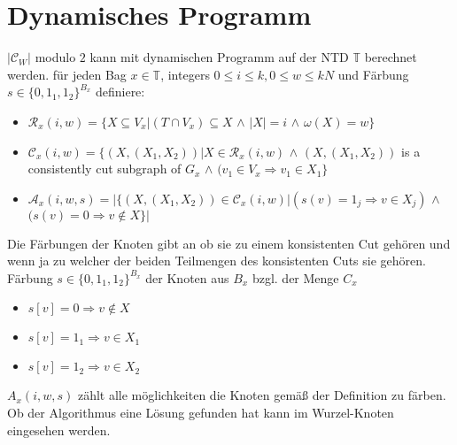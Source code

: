 \section{Dynamisches Programm}
$|\mathcal{C}_W|$ modulo $2$ kann mit dynamischen Programm auf der NTD $\mathbb{T}$ berechnet werden.
für jeden Bag $x \in \mathbb{T}$, integers $0 \leq i \leq k,0 \leq w \leq kN$ und Färbung $s \in \{0,1_1,1_2 \}^{B_x}$ definiere:
\begin{itemize}
\item $\mathcal{R}_x(i,w)=\{X \subseteq V_x | (T \cap V_x) \subseteq X$ $\wedge$ $|X| = i$ $\wedge$ $\omega (X) = w \}$
\item $\mathcal{C}_x (i,w) =\{ (X,(X_1,X_2)) | X \in \mathcal{R}_x(i,w)$ $\wedge$ $(X,(X_1,X_2))$ is a consistently cut subgraph of $G_x$ $\wedge$ $(v_1 \in V_x \Rightarrow v_1 \in X_1 \} $
\item $\mathcal{A}_x(i,w,s)=| \{ (X,(X_1,X_2)) \in \mathcal{C}_x(i,w) | (s(v) = 1_j \Rightarrow v \in X_j)$ $\wedge$ $(s(v)=0 \Rightarrow v \notin X \} |$
\end{itemize}
Die Färbungen der Knoten gibt an ob sie zu einem konsistenten Cut gehören und wenn ja zu welcher der beiden Teilmengen des konsistenten Cuts sie gehören.
Färbung $s \in \{0,1_1,1_2 \}^{B_x}$  der Knoten aus $B_x$ bzgl. der Menge $C_x$
\begin{itemize}
\item $s[v] = 0 \Rightarrow v \notin X$
\item $s[v] = 1_1 \Rightarrow v \in X_1$ 
\item $s[v] = 1_2 \Rightarrow v \in X_2$ 
\end{itemize}

$A_x(i,w,s)$ zählt alle möglichkeiten die Knoten gemäß der Definition zu färben.
Ob der Algorithmus eine Lösung gefunden hat kann im Wurzel-Knoten eingesehen werden.

